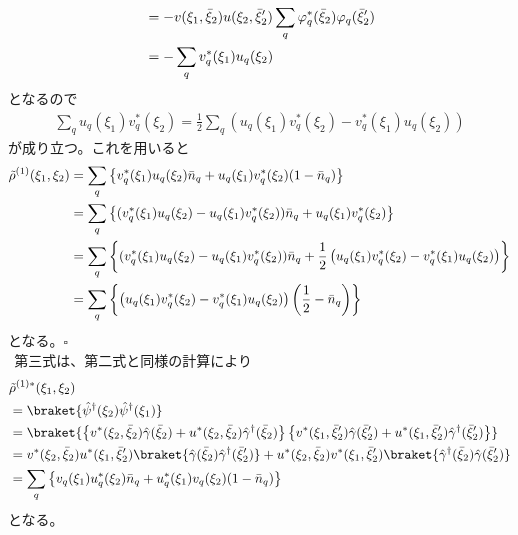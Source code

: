 \documentclass[dvipdfmx, 11pt, a4paper]{jsarticle}
\numberwithin{equation}{section}
\theoremstyle{definition}
\begin{document}
\begin{derivationBox}
\begin{align}
            &= -v(\xi_1,\bar{\xi}_2)u(\xi_2, \bar{\xi}_2') \sum_q \varphi_q^*(\bar{\xi}_2)\varphi_q(\bar{\xi}_2') \notag \\
            &= -\sum_q v_q^*(\xi_1) u_q(\xi_2)
        \end{align}
        となるので
        \begin{align}
            \sum_q u_q(\xi_1)v_q^*(\xi_2) = \frac{1}{2}\sum_q \left( u_q(\xi_1)v^*_q(\xi_2) - v_q^*(\xi_1) u_q(\xi_2) \right)
        \end{align}
        が成り立つ。これを用いると
        \begin{align}
            \tilde{\rho}^{(1)}(\xi_1,\xi_2) &= \sum_q \left\{ v^*_q(\xi_1)u_q(\xi_2)\bar{n}_q + u_q(\xi_1) v^*_q(\xi_2) (1-\bar{n}_q)\right\} \notag \\
            &= \sum_q \left\{ (v^*_q(\xi_1)u_q(\xi_2) - u_q(\xi_1) v^*_q(\xi_2))\bar{n}_q + u_q(\xi_1) v^*_q(\xi_2) \right\} \notag \\ 
            &= \sum_q \left\{ (v^*_q(\xi_1)u_q(\xi_2) - u_q(\xi_1) v^*_q(\xi_2))\bar{n}_q + \frac{1}{2}\left( u_q(\xi_1)v^*_q(\xi_2) - v_q^*(\xi_1) u_q(\xi_2) \right) \right\} \notag \\
            &= \sum_q \left\{ \left( u_q(\xi_1)v^*_q(\xi_2) - v_q^*(\xi_1) u_q(\xi_2) \right) \left( \frac{1}{2} - \bar{n}_q \right) \right\}
        \end{align}
        となる。$\square$\\
        $\ \ $第三式は、第二式と同様の計算により
        \begin{align}
            &\tilde{\rho}^{(1)*}(\xi_1,\xi_2) \notag \\
            &= \braket{\hat{\psi}^\dagger(\xi_2)\hat{\psi}^\dagger(\xi_1)} \notag \\
            &= \braket{\left\{ v^*(\xi_2,\bar{\xi}_2)\hat{\gamma}(\bar{\xi}_2) + u^*(\xi_2,\bar{\xi}_2)\hat{\gamma}^\dagger(\bar{\xi}_2)  \right\} \left\{ v^*(\xi_1,\bar{\xi}_2')\hat{\gamma}(\bar{\xi}_2') + u^*(\xi_1,\bar{\xi}_2')\hat{\gamma}^\dagger(\bar{\xi}_2')  \right\}} \notag \\ 
            &= v^*(\xi_2,\bar{\xi}_2)u^*(\xi_1,\bar{\xi}_2') \braket{\hat{\gamma}(\bar{\xi}_2)\hat{\gamma}^\dagger(\bar{\xi}_2')} + u^*(\xi_2,\bar{\xi}_2)v^*(\xi_1,\bar{\xi}_2') \braket{\hat{\gamma}^\dagger(\bar{\xi}_2)\hat{\gamma}(\bar{\xi}_2')} \notag \\
            &= \sum_q \left\{ v_q(\xi_1)u_q^*(\xi_2) \bar{n}_q + u^*_q(\xi_1)v_q(\xi_2)(1-\bar{n}_q) \right\}
        \end{align}
        となる。
    \end{derivationBox}
\end{document}

